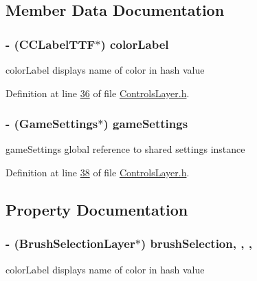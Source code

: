 \subsection{Member Data Documentation}
\hypertarget{interface_controls_layer_aa3d424dcbfa618632f97478ee61148cb}{
\subsubsection[{color\-Label}]{\setlength{\rightskip}{0pt plus 5cm}-\/ (C\-C\-Label\-T\-T\-F$\ast$) color\-Label\hspace{0.3cm}{\ttfamily [protected]}}}\label{d1/d1a/interface_controls_layer_aa3d424dcbfa618632f97478ee61148cb}
color\-Label displays name of color in hash value 

Definition at line \hyperlink{_controls_layer_8h_source_l00036}{36} of file \hyperlink{_controls_layer_8h_source}{Controls\-Layer.\-h}.

\hypertarget{interface_controls_layer_a6fb04c60ed1bfab11e2940a025b4927e}{
\subsubsection[{game\-Settings}]{\setlength{\rightskip}{0pt plus 5cm}-\/ ({\bf Game\-Settings}$\ast$) game\-Settings\hspace{0.3cm}{\ttfamily [protected]}}}\label{d1/d1a/interface_controls_layer_a6fb04c60ed1bfab11e2940a025b4927e}
game\-Settings global reference to shared settings instance 

Definition at line \hyperlink{_controls_layer_8h_source_l00038}{38} of file \hyperlink{_controls_layer_8h_source}{Controls\-Layer.\-h}.



\subsection{Property Documentation}
\hypertarget{interface_controls_layer_a56c514c5fde8025a9de19c4b8225478b}{
\subsubsection[{brush\-Selection}]{\setlength{\rightskip}{0pt plus 5cm}-\/ ({\bf Brush\-Selection\-Layer}$\ast$) brush\-Selection\hspace{0.3cm}{\ttfamily [read]}, {\ttfamily [write]}, {\ttfamily [nonatomic]}, {\ttfamily [strong]}}}\label{d1/d1a/interface_controls_layer_a56c514c5fde8025a9de19c4b8225478b}
color\-Label displays name of color in hash value 

